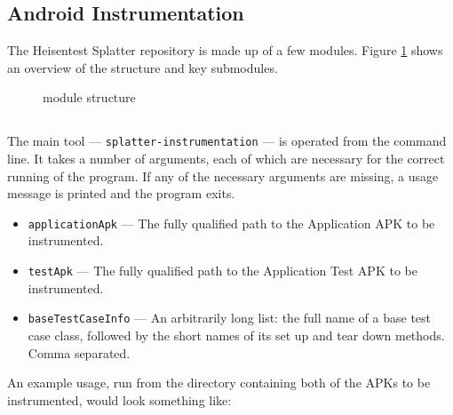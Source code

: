 \subsection{Android Instrumentation}

The Heisentest Splatter repository\cite{heisentestInstrumentation} is made up of a few modules. Figure \ref{fig:repo_structure} shows an overview of the structure and key submodules.

\begin{figure}[h]
\caption{\heisentest{} module structure}
\label{fig:repo_structure}
\end{figure}

\subsection{\splatterinst{}}

The main tool --- {\tt splatter-instrumentation} --- is operated from the command line. It takes a number of arguments, each of which are necessary for the correct running of the program. If any of the necessary arguments are missing, a usage message is printed and the program exits.

\begin{itemize}
    \item {\tt applicationApk} --- The fully qualified path to the Application APK to be instrumented.
    \item {\tt testApk} --- The fully qualified path to the Application Test APK to be instrumented.
    \item {\tt baseTestCaseInfo} --- An arbitrarily long list: the full name of a base test case class, followed by the short names of its set up and tear down methods. Comma separated.
\end{itemize}

An example usage, run from the directory containing both of the APKs to be instrumented, would look something like:

